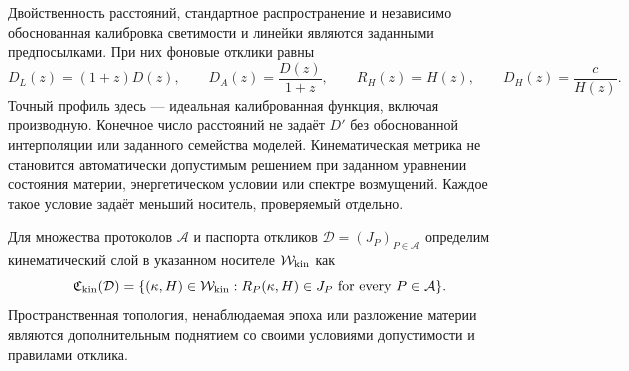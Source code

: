 {Двойственность расстояний, стандартное распространение и независимо обоснованная калибровка светимости и линейки являются заданными предпосылками. При них фоновые отклики равны \cite{Hogg}}
\begin{equation}\label{eq:responses}
 D_L(z)=(1+z)D(z),\qquad D_A(z)=\frac{D(z)}{1+z},\qquad
 R_H(z)=H(z),\qquad D_H(z)=\frac c{H(z)}.
\end{equation}
{Точный профиль здесь --- идеальная калиброванная функция, включая производную. Конечное число расстояний не задаёт $D'$ без обоснованной интерполяции или заданного семейства моделей. Кинематическая метрика не становится автоматически допустимым решением при заданном уравнении состояния материи, энергетическом условии или спектре возмущений. Каждое такое условие задаёт меньший носитель, проверяемый отдельно.}
\begin{definition}\label{def:fibre}
{Для множества протоколов $\mathcal A$ и паспорта откликов $\mathcal D=(J_P)_{P\in\mathcal A}$ определим кинематический слой в указанном носителе $\mathcal W_{\rm kin}$ как}
\begin{equation}\label{eq:fibre}
 \mathfrak C_{\rm kin}(\mathcal D)=\{(\kappa,H)\in\mathcal W_{\rm kin}:R_P(\kappa,H)\in J_P\text{\Lang{ for every }{ для всех }}P\in\mathcal A\}.
\end{equation}
{Пространственная топология, ненаблюдаемая эпоха или разложение материи являются дополнительным поднятием со своими условиями допустимости и правилами отклика.}
\end{definition}

